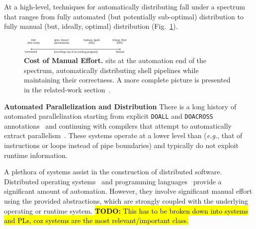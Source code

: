 \documentclass[sigplan,10pt,review,anonymous]{acmart}
\newcommand{\eg}{{\em e.g.}, }
\newcommand{\heading}[1]{\vspace{4pt}\noindent\textbf{#1}\enspace}
\newcommand{\ttt}[1]{\texttt{\small #1}}
\newcommand{\TODO}[1]{\hl{\textbf{TODO:} #1}\xspace}
\begin{document}
At a high-level, techniques for automatically distributing fall under a spectrum that ranges from fully automated (but potentially sub-optimal) distribution to fully manual (but, ideally, optimal) distribution (Fig.~\ref{fig:spectrum}).

\begin{figure}[t]
\centering
\includegraphics[width=0.49\textwidth]{./figs/dish_spectrum.pdf}
\caption{
  \textbf{Cost of Manual Effort.}
	\sys sits at the automation end of the spectrum, automatically distributing shell pipelines while maintaining their correctness. A more complete picture is presented in the related-work section~.
}
\label{fig:spectrum}
\end{figure}

\heading{Automated Parallelization and Distribution}
There is a long history of automated parallelization starting from explicit \ttt{DOALL} and \ttt{DOACROSS} annotations~\cite{par1, par2} and continuing with compilers that attempt to automatically extract parallelism~\cite{padua1993polaris,hall1996maximizing}.
These systems operate at a lower level than \sys (\eg that of instructions or loops instead of pipe boundaries) and typically do not exploit runtime information.

A plethora of systems assist in the construction of distributed software.
Distributed operating systems~\cite{rashid1981accent, walker1983locus, ousterhout1988sprite, mullender1990amoeba, pike1990plan9, rozier1991overview, dorward1997inferno, barak1998mosix, schwarzkopf2013dios, sacha2013osprey} and programming languages~\cite{erlang:96, acute:05, mace:07, cloudhaskell:11}
provide a significant amount of automation. %
However, they involve significant manual effort using the provided abstractions, which are strongly coupled with the underlying operating or runtime system.
\TODO{This has to be broken down into systems and PLs, coz systems are the most relevant/important class.}
\end{document}
